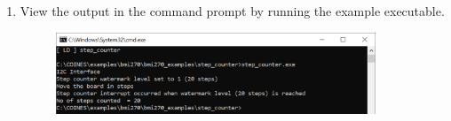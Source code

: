 \documentclass{article}
\begin{document}
\begin{enumerate}
\begin{figure}[H]
\begin{center}
		\end{center}
	\end{figure}
	\item View the output in the command prompt by running the example executable.
	\begin{figure}[H]
		\begin{center}
			\includegraphics[width=0.9\textwidth]{coinesAPI_images/Pc_example_output.png}
		\end{center}
	\end{figure}
\end{enumerate}
\end{document}
